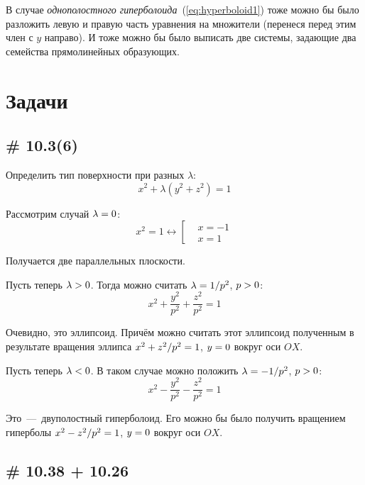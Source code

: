\documentclass[a4paper,12pt]{article}
\begin{document}
  В случае \emph{однополостного гиперболоида}~(\ref{eq:hyperboloid1}) тоже можно бы было разложить левую и правую часть уравнения на множители (перенеся перед этим член с $y$ направо).
  И тоже можно бы было выписать две системы, задающие два семейства прямолинейных образующих.
  
  
  \section{Задачи}
  
  \subsection{\# 10.3(6)}
  
  Определить тип поверхности при разных $\lambda$:
  \[
    x^2 + \lambda (y^2 + z^2) = 1
  \]
  
  \begin{solution}
    Рассмотрим случай $\lambda \hm= 0$:
    \[
      x^2 = 1 \leftrightarrow \left[
        \begin{aligned}
          &x = -1\\
          &x = 1
        \end{aligned}
      \right.
    \]
    
    Получается две параллельных плоскости.
    
    \medskip
    
    Пусть теперь $\lambda \hm> 0$.
    Тогда можно считать $\lambda \hm= 1/p^2$, $p \hm> 0$:
    \[
      x^2 + \frac{y^2}{p^2} + \frac{z^2}{p^2} = 1
    \]
    
    Очевидно, это эллипсоид.
    Причём можно считать этот эллипсоид полученным в результате вращения эллипса $x^2 \hm+ z^2/p^2 \hm= 1$, $y \hm= 0$ вокруг оси $OX$. 
    
    \medskip
    
    Пусть теперь $\lambda \hm< 0$.
    В таком случае можно положить $\lambda \hm= -1/p^2$, $p \hm> 0$:
    \[
      x^2 - \frac{y^2}{p^2} - \frac{z^2}{p^2} = 1
    \]
    
    Это~---~двуполостный гиперболоид.
    Его можно бы было получить вращением гиперболы $x^2 \hm- z^2/p^2 \hm= 1$, $y \hm= 0$ вокруг оси $OX$.
  \end{solution}
  
  
  \subsection{\# 10.38 + 10.26}
  
\end{document}
